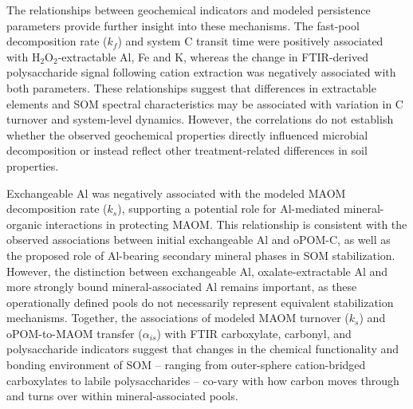 \documentclass[preprint,12pt]{elsarticle}
\begin{document}
The relationships between geochemical indicators and modeled persistence parameters provide further insight into these mechanisms. The fast-pool decomposition rate ($k_f$) and system C transit time were positively associated with H$_2$O$_2$-extractable Al, Fe and K, whereas the change in FTIR-derived polysaccharide signal following cation extraction was negatively associated with both parameters. These relationships suggest that differences in extractable elements and SOM spectral characteristics may be associated with variation in C turnover and system-level dynamics. However, the correlations do not establish whether the observed geochemical properties directly influenced microbial decomposition or instead reflect other treatment-related differences in soil properties.

Exchangeable Al was negatively associated with the modeled MAOM decomposition rate ($k_s$), supporting a potential role for Al-mediated mineral-organic interactions in protecting MAOM. This relationship is consistent with the observed associations between initial exchangeable Al and oPOM-C, as well as the proposed role of Al-bearing secondary mineral phases in SOM stabilization. However, the distinction between exchangeable Al, oxalate-extractable Al and more strongly bound mineral-associated Al remains important, as these operationally defined pools do not necessarily represent equivalent stabilization mechanisms. Together, the associations of modeled MAOM turnover ($k_s$) and oPOM-to-MAOM transfer ($\alpha_{is}$) with FTIR carboxylate, carbonyl, and polysaccharide indicators suggest that changes in the chemical functionality and bonding environment of SOM – ranging from outer-sphere cation-bridged carboxylates to labile polysaccharides – co-vary with how carbon moves through and turns over within mineral-associated pools.
\end{document}
